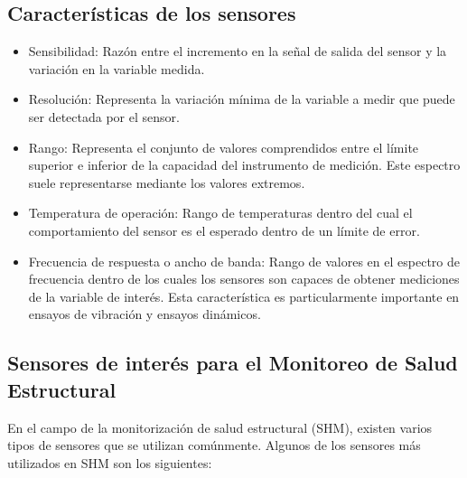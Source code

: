 \subsection{Características de los sensores}

\begin{itemize}
    \item Sensibilidad: Razón entre el incremento en la señal de salida del sensor y la variación en la variable medida.
    \item Resolución: Representa la variación mínima de la variable a medir que puede ser detectada por el sensor.
    \item Rango: Representa el conjunto de valores comprendidos entre el límite superior e inferior de la capacidad del instrumento de medición. Este espectro suele representarse mediante los valores extremos.
    \item Temperatura de operación: Rango de temperaturas dentro del cual el comportamiento del sensor es el esperado dentro de un límite de error.
    \item Frecuencia de respuesta o ancho de banda: Rango de valores en el espectro de frecuencia dentro de los cuales los sensores son capaces de obtener mediciones de la variable de interés. Esta característica es particularmente importante en ensayos de vibración y ensayos dinámicos.
\end{itemize}

\subsection{Sensores de interés para el Monitoreo de Salud Estructural}

En el campo de la monitorización de salud estructural (SHM), existen varios tipos de sensores que se utilizan comúnmente. Algunos de los sensores más utilizados en SHM son los siguientes:

